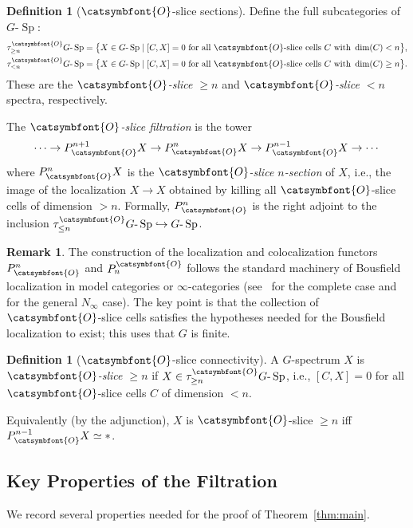 \documentclass[12pt]{article}
\newcommand{\aO}{{\catsymbfont{O}}}
\DeclareMathOperator{\Sp}{Sp}
\newcommand{\SpG}{G\text{-}\Sp}
\theoremstyle{definition}
\newtheorem{definition}[theorem]{Definition}
\newtheorem{remark}[theorem]{Remark}
\begin{document}
\begin{definition}[$\aO$-slice sections]\label{def:slice-filtration}
Define the full subcategories of $\SpG$:
\begin{align*}
   \tau_{\geq n}^\aO \SpG &= \bigl\{ X \in \SpG \mid [C, X] = 0 \text{ for all } \aO\text{-slice cells } C \text{ with } \dim(C) < n \bigr\},\\
   \tau_{< n}^\aO \SpG &= \bigl\{ X \in \SpG \mid [C, X] = 0 \text{ for all } \aO\text{-slice cells } C \text{ with } \dim(C) \geq n \bigr\}.
\end{align*}
These are the \emph{$\aO$-slice $\geq n$} and \emph{$\aO$-slice $< n$} spectra, respectively.

The \emph{$\aO$-slice filtration} is the tower
\[
   \cdots \to P^{n+1}_\aO X \to P^n_\aO X \to P^{n-1}_\aO X \to \cdots
\]
where $P^n_\aO X$ is the \emph{$\aO$-slice $n$-section} of $X$, i.e., the image of the localization $X \to X$ obtained by killing all $\aO$-slice cells of dimension $> n$.  Formally, $P^n_\aO$ is the right adjoint to the inclusion $\tau_{\leq n}^\aO\SpG \hookrightarrow \SpG$.
\end{definition}

\begin{remark}
The construction of the localization and colocalization functors $P^n_\aO$ and $P_n^\aO$ follows the standard machinery of Bousfield localization in model categories or $\infty$-categories (see~\cite[{\S}4.2]{HHR} for the complete case and~\cite[{\S}5]{BlumbergHill} for the general $N_\infty$ case).  The key point is that the collection of $\aO$-slice cells satisfies the hypotheses needed for the Bousfield localization to exist; this uses that $G$ is finite.
\end{remark}

\begin{definition}[$\aO$-slice connectivity]\label{def:slice-connectivity}
A $G$-spectrum $X$ is \emph{$\aO$-slice $\geq n$} if $X \in \tau_{\geq n}^\aO \SpG$, i.e., $[C, X] = 0$ for all $\aO$-slice cells $C$ of dimension $< n$.

Equivalently (by the adjunction), $X$ is $\aO$-slice $\geq n$ iff $P^{n-1}_\aO X \simeq *$.
\end{definition}

\subsection{Key Properties of the Filtration}

We record several properties needed for the proof of Theorem~\ref{thm:main}.
\end{document}
